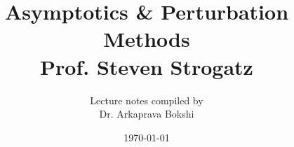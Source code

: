 


\title{Asymptotics \& Perturbation Methods\\
		Prof. Steven Strogatz}
\author{Lecture notes compiled by \\
		Dr. Arkaprava Bokshi}
\date{\today}

	\maketitle
	\tableofcontents
	\newpage
































\appendix







